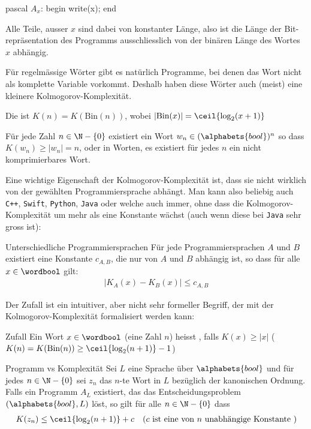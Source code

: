 \begin{code}{pascal}
    $A_x$: begin
    write(x);
    end
\end{code}
Alle Teile, ausser $x$ sind dabei von konstanter Länge, also ist die Länge der Bit-repräsentation des Programms ausschliesslich von der binären Länge des Wortes $x$ abhängig.

\proven


Für regelmässige Wörter gibt es natürlich Programme, bei denen das Wort nicht als komplette Variable vorkommt.
Deshalb haben diese Wörter auch (meist) eine kleinere Kolmogorov-Komplexität.


 Die  ist $K(n) = K(\text{Bin}(n))$,
wobei $|\text{Bin}(x)| = \ceil{\log_2(x + 1)}$

\inlinelemma Für jede Zahl $n \in \N - \{ 0 \}$ existiert ein Wort $w_n \in (\alphabets{bool})^n$ so dass $K(w_n) \geq |w_n| = n$, oder in Worten, es existiert für jedes $n$ ein nicht komprimierbares Wort.

Eine wichtige Eigenschaft der Kolmogorov-Komplexität ist, dass sie nicht wirklich von der gewählten Programmiersprache abhängt.
Man kann also beliebig auch \texttt{C++}, \texttt{Swift}, \texttt{Python}, \texttt{Java} oder welche auch immer, ohne dass die Kolmogorov-Komplexität um mehr als eine Konstante wächst (auch wenn diese bei \texttt{Java} sehr gross ist):

\begin{theorem}[]{Unterschiedliche Programmiersprachen}
    Für jede Programmiersprachen $A$ und $B$ existiert eine Konstante $c_{A,B}$, die nur von $A$ und $B$ abhängig ist, so dass für alle $x \in \wordbool$ gilt:
    \begin{align*}
        |K_A(x) - K_B(x)| \leq c_{A, B}
    \end{align*}
\end{theorem}


 Der Zufall ist ein intuitiver, aber nicht sehr formeller Begriff, der mit der Kolmogorov-Komplexität formalisiert werden kann:
\begin{definition}[]{Zufall}
    Ein Wort $x \in \wordbool$ (eine Zahl $n$) heisst , falls $K(x) \geq |x|$ ($K(n) = K(\text{Bin}(n)) \geq \ceil{\log_2(n + 1)} - 1$)
\end{definition}

\begin{theorem}[]{Programm vs Komplexität}
    Sei $L$ eine Sprache über $\alphabets{bool}$ und für jedes $n \in \N - \{0\}$ sei $z_n$ das $n$-te Wort in $L$ bezüglich der kanonischen Ordnung.
    Falls ein Programm $A_L$ existiert, das das Entscheidungsproblem $(\alphabets{bool}, L)$ löst, so gilt für alle $n \in \N - \{ 0 \}$ dass
    \begin{align*}
        K(z_n) \leq \ceil{\log_2(n + 1)} + c &  & (c \text{ ist eine von } n \text{ unabhängige Konstante })
    \end{align*}
\end{theorem}

